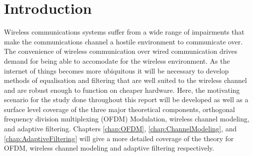 \chapter{Introduction}
\label{ch:Introduction}
Wireless communications systems suffer from a wide %
range of impairments that make the communications %
channel a hostile environment to communicate over. %
The convenience of wireless communication over %
wired communication drives demand for being able %
to accomodate for the wireless environment. %
As the internet of things becomes more ubiquitous %
it will be necessary to develop methods of %
equalisation and filtering that are well suited to the %
wireless channel and are robust enough to function %
on cheaper hardware. Here, the motivating %
scenario for the study done throughout this %
report will be developed as well as a surface level %
coverage of the three major theoretical components, %
orthogonal frequency division multiplexing (OFDM) %
Modulation, wireless channel modeling, and %
adaptive filtering. Chapters \ref{chap:OFDM}, %
\ref{chap:ChannelModeling}, and %
\ref{chap:AdaptiveFiltering} will give a more detailed %
coverage of the theory for OFDM, wireless channel %
modeling and adaptive filtering respectively.

